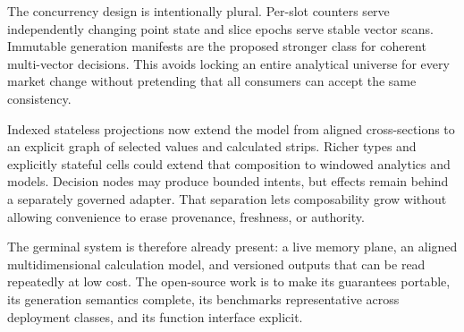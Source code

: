 \documentclass{strategynet-journal}
\begin{document}
\begin{SNcolumns}
The concurrency design is intentionally plural.  Per-slot counters serve
independently changing point state and slice epochs serve stable vector scans.
Immutable generation manifests are the proposed stronger class for coherent
multi-vector decisions.  This
avoids locking an entire analytical universe for every market change without
pretending that all consumers can accept the same consistency.

Indexed stateless projections now extend the model from aligned cross-sections
to an explicit graph of selected values and calculated strips.  Richer types
and explicitly stateful cells could extend that composition to windowed
analytics and models.  Decision nodes may produce bounded intents, but effects remain
behind a separately governed adapter.  That separation lets composability grow
without allowing convenience to erase provenance, freshness, or authority.

The germinal system is therefore already present: a live memory plane, an
aligned multidimensional calculation model, and versioned outputs that can be
read repeatedly at low cost.  The open-source work is to make its guarantees
portable, its generation semantics complete, its benchmarks representative
across deployment classes, and its function interface explicit.

\end{SNcolumns}
\end{document}
